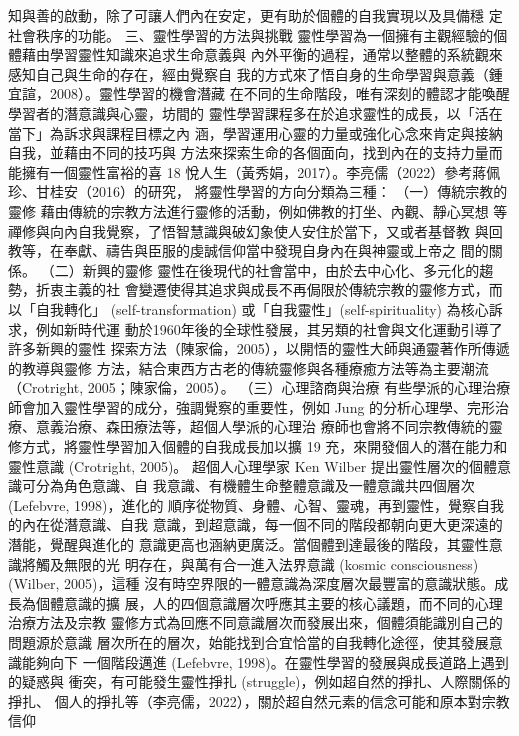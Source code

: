 知與善的啟動，除了可讓人們內在安定，更有助於個體的自我實現以及具備穩
定社會秩序的功能。 
三、靈性學習的方法與挑戰 
靈性學習為一個擁有主觀經驗的個體藉由學習靈性知識來追求生命意義與
內外平衡的過程，通常以整體的系統觀來感知自己與生命的存在，經由覺察自
我的方式來了悟自身的生命學習與意義（鍾宜諠，2008）。靈性學習的機會潛藏
在不同的生命階段，唯有深刻的體認才能喚醒學習者的潛意識與心靈，坊間的
靈性學習課程多在於追求靈性的成長，以「活在當下」為訴求與課程目標之內
涵，學習運用心靈的力量或強化心念來肯定與接納自我，並藉由不同的技巧與
方法來探索生命的各個面向，找到內在的支持力量而能擁有一個靈性富裕的喜
18 
悅人生（黃秀娟，2017）。李亮儒（2022）參考蔣佩珍、甘桂安（2016）的研究，
將靈性學習的方向分類為三種： 
（一）傳統宗教的靈修 
藉由傳統的宗教方法進行靈修的活動，例如佛教的打坐、內觀、靜心冥想
等禪修與向內自我覺察，了悟智慧識與破幻象使人安住於當下，又或者基督教
與回教等，在奉獻、禱告與臣服的虔誠信仰當中發現自身內在與神靈或上帝之
間的關係。 
（二）新興的靈修 
靈性在後現代的社會當中，由於去中心化、多元化的趨勢，折衷主義的社
會變遷使得其追求與成長不再侷限於傳統宗教的靈修方式，而以「自我轉化」
(self-transformation) 或「自我靈性」(self-spirituality) 為核心訴求，例如新時代運
動於1960年後的全球性發展，其另類的社會與文化運動引導了許多新興的靈性
探索方法（陳家倫，2005），以開悟的靈性大師與通靈著作所傳遞的教導與靈修
方法，結合東西方古老的傳統靈修與各種療癒方法等為主要潮流（Crotright, 
2005；陳家倫，2005）。 
（三）心理諮商與治療 
有些學派的心理治療師會加入靈性學習的成分，強調覺察的重要性，例如
Jung 的分析心理學、完形治療、意義治療、森田療法等，超個人學派的心理治
療師也會將不同宗教傳統的靈修方式，將靈性學習加入個體的自我成長加以擴
19 
充，來開發個人的潛在能力和靈性意識 (Crotright, 2005)。 
超個人心理學家 Ken Wilber 提出靈性層次的個體意識可分為角色意識、自
我意識、有機體生命整體意識及一體意識共四個層次 (Lefebvre, 1998)，進化的
順序從物質、身體、心智、靈魂，再到靈性，覺察自我的內在從潛意識、自我
意識，到超意識，每一個不同的階段都朝向更大更深遠的潛能，覺醒與進化的
意識更高也涵納更廣泛。當個體到達最後的階段，其靈性意識將觸及無限的光
明存在，與萬有合一進入法界意識 (kosmic consciousness) (Wilber, 2005)，這種
沒有時空界限的一體意識為深度層次最豐富的意識狀態。成長為個體意識的擴
展，人的四個意識層次呼應其主要的核心議題，而不同的心理治療方法及宗教
靈修方式為回應不同意識層次而發展出來，個體須能識別自己的問題源於意識
層次所在的層次，始能找到合宜恰當的自我轉化途徑，使其發展意識能夠向下
一個階段邁進 (Lefebvre, 1998)。在靈性學習的發展與成長道路上遇到的疑惑與
衝突，有可能發生靈性掙扎 (struggle)，例如超自然的掙扎、人際關係的掙扎、
個人的掙扎等（李亮儒，2022），關於超自然元素的信念可能和原本對宗教信仰
